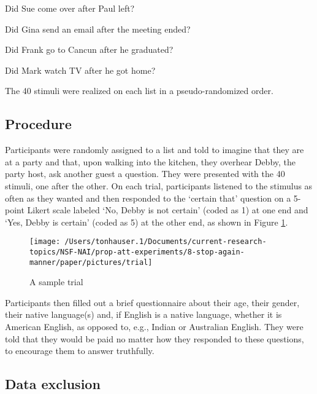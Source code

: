 \documentclass[a4paper,12pt]{article}
\newcommand{\6}{\mbox{$[\hspace*{-.6mm}[$}}
\newcommand{\9}{\mbox{$]\hspace*{-.6mm}]$}}
\begin{document}
\begin{exe}
\ex\label{controls} 
\begin{xlist}

\ex Did Sue come over after Paul left?

\ex Did Gina send an email after the meeting ended?

\ex Did Frank go to Cancun after he graduated?

\ex Did Mark watch TV after he got home?

\end{xlist}
\end{exe}

The 40 stimuli were realized on each list in a pseudo-randomized order.

\subsection{Procedure}

Participants were randomly assigned to a list and told to imagine that they are at a party and that, upon walking into the kitchen, they overhear Debby, the party host, ask another guest a question. They were presented with the 40 stimuli, one after the other. On each trial, participants listened to the stimulus as often as they wanted and then responded to the `certain that' question on a 5-point Likert scale labeled `No, Debby is not certain' (coded as 1) at one end and `Yes, Debby is certain' (coded as 5) at the other end, as shown in Figure \ref{f-trial}. 


\begin{figure}[h!]
\centering

\texttt{[image: /Users/tonhauser.1/Documents/current-research-topics/NSF-NAI/prop-att-experiments/8-stop-again-manner/paper/pictures/trial]} 


\caption{A sample trial}\label{f-trial}
\end{figure}

Participants then filled out a brief questionnaire about their age, their gender, their native language(s) and, if English is a native language, whether it is American English, as opposed to, e.g., Indian or Australian English. They were told that they would be paid no matter how they responded to these questions, to encourage them to answer truthfully.

\subsection{Data exclusion}
\end{document}
